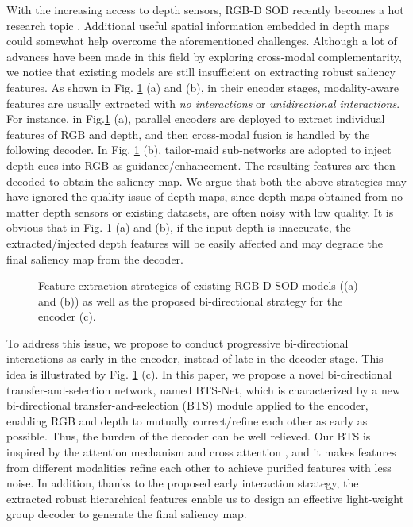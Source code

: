 \documentclass{article}
\begin{document}
With the increasing access to depth sensors, RGB-D SOD recently becomes a hot research topic \cite{BBSNet,JLDCF,UCNet,HDFNet}. Additional useful spatial information embedded in depth maps could somewhat help overcome the aforementioned challenges. 
Although a lot of advances \cite{RGBDsurvey} have been made in this field by exploring cross-modal complementarity\cite{PCF,HDFNet,UCNet,DRMA,JLDCF,SSF,cmMS,PGAR,PDNet,CPFP,BBSNet,MMCI,A2dele,CoNet,D3Net,DANet,LSSA}, we notice that existing models are still insufficient on extracting robust saliency features. As shown in Fig. \ref{class} (a) and (b), in their encoder stages, modality-aware features are usually extracted with \emph{no interactions} or \emph{unidirectional interactions}. 
For instance, in Fig.\ref{class} (a), parallel encoders\cite{PCF,DRMA,JLDCF,SSF,HDFNet,PDNet} are deployed to extract individual features of RGB and depth, and then cross-modal fusion is handled by the following decoder. In Fig. \ref{class} (b), tailor-maid sub-networks\cite{PDNet,BBSNet,CPFP} are adopted to inject depth cues into RGB as guidance/enhancement. The resulting features are then decoded to obtain the saliency map. We argue that both the above strategies may have ignored the quality issue of depth maps, since depth maps obtained from no matter depth sensors or existing datasets, are often noisy with low quality. It is obvious that in Fig. \ref{class} (a) and (b), if the input depth is inaccurate, the extracted/injected depth features will be easily affected and may degrade the final saliency map from the decoder. 

\begin{figure}
  \centering
 \centerline{}\vspace{-0.3cm}
\caption{Feature extraction strategies of existing RGB-D SOD models ((a) \cite{PCF,DRMA,JLDCF,SSF,HDFNet,PDNet} and (b)\cite{PDNet,BBSNet,CPFP}) as well as the proposed bi-directional strategy for the encoder (c).}\vspace{-0.3cm}
\label{class}
\end{figure}


To address this issue, we propose to conduct progressive bi-directional interactions as early in the encoder, instead of late in the decoder stage. This idea is illustrated by Fig. \ref{class} (c). In this paper, we propose a novel bi-directional transfer-and-selection network, named BTS-Net, which is characterized by a new bi-directional transfer-and-selection (BTS) module applied to the encoder, enabling RGB and depth to mutually correct/refine each other as early as possible. Thus, the burden of the decoder can be well relieved. Our BTS is inspired by the attention mechanism \cite{CBAM} and cross attention \cite{CrossAtt}, and it makes features from different modalities refine each other to achieve purified features with less noise. In addition, thanks to the proposed early interaction strategy, the extracted robust hierarchical features enable us to design an effective light-weight group decoder to generate the final saliency map. 
\end{document}
